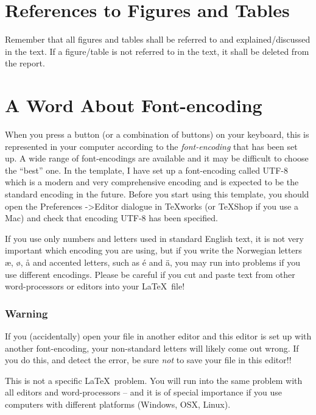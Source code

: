 \documentclass[../Main/thesis.tex]{subfiles}
\begin{document}
\section{References to Figures and Tables}
\label{sec:references_to_figures_and_tables}
Remember that all figures and tables shall be referred to and explained/discussed in the text. 
If a figure/table is not referred to in the text, it shall be deleted from the report.
\section{A Word About Font-encoding}
\label{sec:a_word_about_font-encoding}
When you press a button (or a combination of buttons) on your keyboard, this is represented in your computer according to the \emph{font-encoding} that has been set up. 
A wide range of font-encodings are available and it may be difficult to choose the ``best'' one. 
In the template, I have set up a font-encoding called UTF-8 which is a modern and very comprehensive encoding and is expected to be the standard encoding in the future. 
Before you start using this template, you should open the Preferences ->Editor dialogue in TeXworks (or TeXShop if you use a Mac) and check that encoding UTF-8 has been specified. 

If you use only numbers and letters used in standard English text, it is not very important which encoding you are using, but if you write the Norwegian letters æ, ø, å and accented letters, such as é and ä, you may run into problems if you use different encodings. 
Please be careful if you cut and paste text from other word-processors or editors into your \LaTeX\ file!

\subsubsection*{Warning}
If you (accidentally) open your file in another editor and this editor is set up with another font-encoding, your non-standard letters will likely come out wrong. 
If you do this, and detect the error, be sure \emph{not} to save your file in this editor!!

This is not a specific \LaTeX\ problem. 
You will run into the same problem with all editors and word-processors -- and it is of special importance if you use computers with different platforms (Windows, OSX, Linux).

\end{document}
